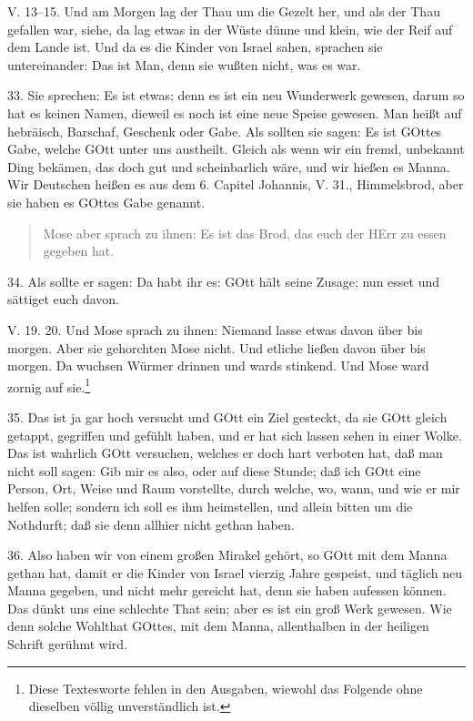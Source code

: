 \begin{schriftzitat}
V. 13–15. Und am Morgen lag der Thau um die Gezelt her, und als der Thau gefallen war, siehe, da lag etwas in der Wüste dünne und klein, wie der Reif auf dem Lande ist. Und da es die Kinder von Israel sahen, sprachen sie untereinander: Das ist Man, denn sie wußten nicht, was es war.
\end{schriftzitat}

33. Sie sprechen: Es ist etwas; denn es ist ein neu Wunderwerk gewesen, darum so hat es keinen Namen, dieweil es noch ist eine neue Speise gewesen. Man heißt auf hebräisch, Barschaf, Geschenk oder Gabe. Als sollten sie sagen: Es ist GOttes Gabe, welche GOtt unter uns austheilt. Gleich als wenn wir ein fremd, unbekannt Ding bekämen, das doch gut und scheinbarlich wäre, und wir hießen es Manna. Wir Deutschen heißen es aus dem 6. Capitel Johannis, V. 31., Himmelsbrod, aber sie haben es GOttes Gabe genannt.

\begin{quote}
Mose aber sprach zu ihnen: Es ist das Brod, das euch der HErr zu essen gegeben hat.
\end{quote}

34. Als sollte er sagen: Da habt ihr es: GOtt hält seine Zusage; nun esset und sättiget euch davon.

\begin{schriftzitat}
V. 19. 20. Und Mose sprach zu ihnen: Niemand lasse etwas davon über bis morgen. Aber sie gehorchten Mose nicht. Und etliche ließen davon über bis morgen. Da wuchsen Würmer drinnen und wards stinkend. Und Mose ward zornig auf sie.\footnote{Diese Textesworte fehlen in den Ausgaben, wiewohl das Folgende ohne dieselben völlig unverständlich ist.}
\end{schriftzitat}

35. Das ist ja gar hoch versucht und GOtt ein Ziel gesteckt, da sie GOtt gleich getappt, gegriffen und gefühlt haben, und er hat sich lassen sehen in einer Wolke. Das ist wahrlich GOtt versuchen, welches er doch hart verboten hat, daß man nicht soll sagen: Gib mir es also, oder auf diese Stunde; daß ich GOtt eine Person, Ort, Weise und Raum vorstellte, durch welche, wo, wann, und wie er mir helfen solle; sondern ich soll es ihm heimstellen, und allein bitten um die Nothdurft; daß sie denn allhier nicht gethan haben.

36. Also haben wir von einem großen Mirakel gehört, so GOtt mit dem Manna gethan hat, damit er die Kinder von Israel vierzig Jahre gespeist, und täglich neu Manna gegeben, und nicht mehr gereicht hat, denn sie haben aufessen können. Das dünkt uns eine schlechte That sein; aber es ist ein groß Werk gewesen. Wie denn solche Wohlthat GOttes, mit dem Manna, allenthalben in der heiligen Schrift gerühmt wird.

